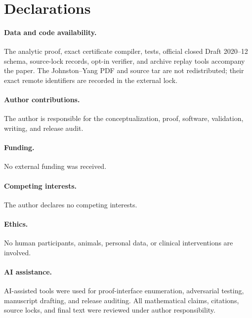 \documentclass[11pt]{article}
\theoremstyle{definition}
\theoremstyle{remark}
\begin{document}
\section*{Declarations}

\paragraph{Data and code availability.}
The analytic proof, exact certificate compiler, tests, official closed
Draft 2020--12 schema, source-lock records, opt-in verifier, and archive
replay tools accompany the paper.  The Johnston--Yang PDF and source tar
are not redistributed; their exact remote identifiers are recorded in the
external lock.

\paragraph{Author contributions.}
The author is responsible for the conceptualization, proof, software,
validation, writing, and release audit.

\paragraph{Funding.}
No external funding was received.

\paragraph{Competing interests.}
The author declares no competing interests.

\paragraph{Ethics.}
No human participants, animals, personal data, or clinical interventions
are involved.

\paragraph{AI assistance.}
AI-assisted tools were used for proof-interface enumeration, adversarial
testing, manuscript drafting, and release auditing.  All mathematical
claims, citations, source locks, and final text were reviewed under author
responsibility.



\end{document}
